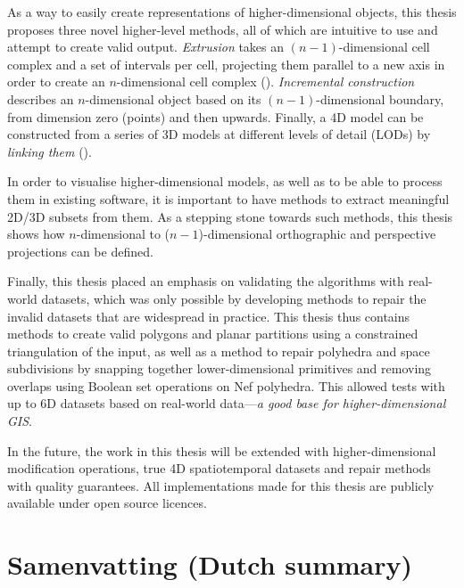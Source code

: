 As a way to easily create representations of higher-dimensional objects, this thesis proposes three novel higher-level methods, all of which are intuitive to use and attempt to create valid output.
\emph{Extrusion} takes an $(n-1)$-dimensional cell complex and a set of intervals per cell, projecting them parallel to a new axis in order to create an $n$-dimensional cell complex ().
\emph{Incremental construction} describes an $n$-dimensional object based on its $(n-1)$-dimensional boundary, from dimension zero (points) and then upwards.
Finally, a 4D model can be constructed from a series of 3D models at different levels of detail (LODs) by \emph{linking them} ().

In order to visualise higher-dimensional models, as well as to be able to process them in existing software, it is important to have methods to extract meaningful 2D/3D subsets from them.
As a stepping stone towards such methods, this thesis shows how $n$-dimensional to ($n-1$)-dimensional orthographic and perspective projections can be defined.

Finally, this thesis placed an emphasis on validating the algorithms with real-world datasets, which was only possible by developing methods to repair the invalid datasets that are widespread in practice.
This thesis thus contains methods to create valid polygons and planar partitions using a constrained triangulation of the input, as well as a method to repair polyhedra and space subdivisions by snapping together lower-dimensional primitives and removing overlaps using Boolean set operations on Nef polyhedra.
This allowed tests with up to 6D datasets based on real-world data---\emph{a good base for higher-dimensional GIS}.

In the future, the work in this thesis will be extended with higher-dimensional modification operations, true 4D spatiotemporal datasets and repair methods with quality guarantees.
All implementations made for this thesis are publicly available under open source licences.

\chapter{Samenvatting (Dutch summary)}

